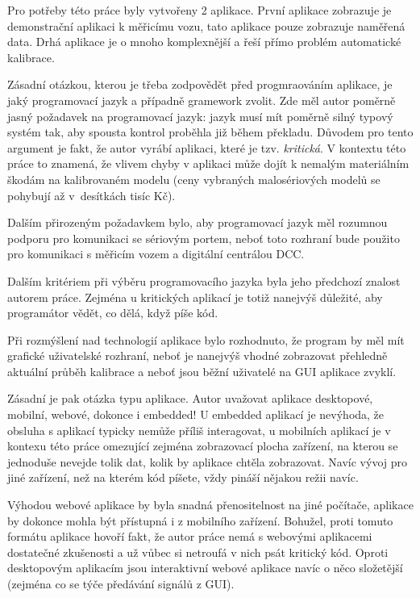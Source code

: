 Pro potřeby této práce byly vytvořeny 2 aplikace. První aplikace zobrazuje je
demonstrační aplikaci k měřicímu vozu, tato aplikace pouze zobrazuje naměřená
data. Drhá aplikace je o mnoho komplexnější a řeší přímo problém automatické
kalibrace.

Zásadní otázkou, kterou je třeba zodpovědět před progmraováním aplikace, je
jaký programovací jazyk a případně gramework zvolit. Zde měl autor poměrně
jasný požadavek na programovací jazyk: jazyk musí mít poměrně silný typový
systém tak, aby spousta kontrol proběhla již během překladu. Důvodem pro tento
argument je fakt, že autor vyrábí aplikaci, které je tzv. \textit{kritická}.
V kontextu této práce to znamená, že vlivem chyby v aplikaci může dojít
k nemalým materiálním škodám na kalibrovaném modelu (ceny vybraných
malosériových modelů se pohybují až v~desítkách tisíc Kč).

Dalším přirozeným požadavkem bylo, aby programovací jazyk měl rozumnou podporu
pro komunikaci se sériovým portem, neboť toto rozhraní bude použito pro
komunikaci s měřicím vozem a digitální centrálou DCC.

Dalším kritériem při výběru programovacího jazyka byla jeho předchozí znalost
autorem práce. Zejména u kritických aplikací je totiž nanejvýš důležité, aby
programátor vědět, co dělá, když píše kód.

Při rozmýšlení nad technologií aplikace bylo rozhodnuto, že program by měl
mít grafické uživatelské rozhraní, neboť je nanejvýš vhodné zobrazovat přehledně
aktuální průběh kalibrace a neboť jsou běžní uživatelé na GUI aplikace zvyklí.

Zásadní je pak otázka typu aplikace. Autor uvažovat aplikace desktopové,
mobilní, webové, dokonce i embedded! U embedded aplikací je nevýhoda, že
obsluha s aplikací typicky nemůže příliš interagovat, u mobilních aplikací
je v kontexu této práce omezující zejména zobrazovací plocha zařízení, na
kterou se jednoduše nevejde tolik dat, kolik by aplikace chtěla zobrazovat.
Navíc vývoj pro jiné zařízení, než na kterém kód píšete, vždy pináší nějakou
režii navíc.

Výhodou webové aplikace by byla snadná přenositelnost na jiné počítače,
aplikace by dokonce mohla být přístupná i z mobilního zařízení. Bohužel, proti
tomuto formátu aplikace hovoří fakt, že autor práce nemá s webovými aplikacemi
dostatečné zkušenosti a už vůbec si netroufá v nich psát kritický kód.
Oproti desktopovým aplikacím jsou interaktivní webové aplikace navíc o něco
složetější (zejména co se týče předávání signálů z GUI).

